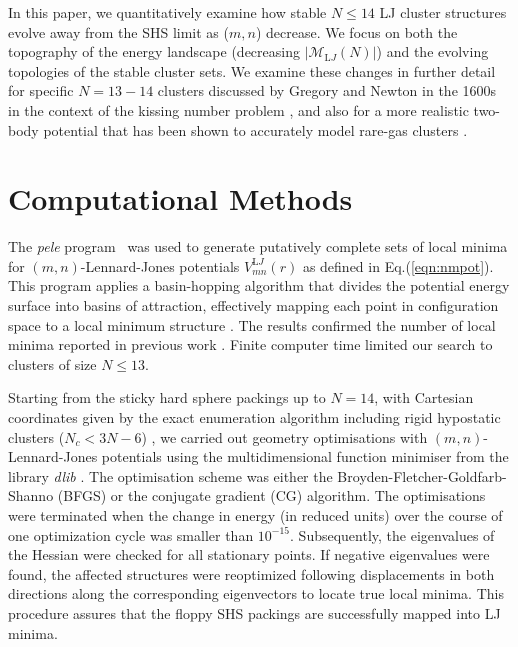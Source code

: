 In this paper, we quantitatively examine how stable $N \leq 14$ LJ cluster
structures evolve away from the SHS limit as ($m, n$) decrease.  We focus on
both the topography of the energy landscape (decreasing
$|\mathcal{M}_{\mathrm LJ}(N)|$) and the evolving topologies of the stable cluster sets.
We examine these changes in further detail for specific $N = 13-14$ clusters discussed by
Gregory and Newton in the 1600s in the context of the kissing number problem
\autocite{Schutte_ProblemdreizehnKugeln_1952}, and also for a more realistic two-body potential that has
been shown to accurately model rare-gas clusters \autocite{Schwerdtfeger_ExtensionLennardJonespotential_2006}.


\section{Computational Methods}

The \textit{pele} program~\autocite{_pelePythonenergy_2017} was used to generate putatively
complete sets of local minima for $(m,n)$-Lennard-Jones potentials 
$V_{mn}^{\mathrm LJ}(r)$ as defined in Eq.(\ref{eqn:nmpot}).
This program  applies a basin-hopping algorithm that divides the potential energy
surface into basins of attraction, effectively mapping each point in
configuration space to a local minimum structure
\autocite{lis87,waless99,Wales_GlobalOptimizationBasinHopping_1997}.  The results confirmed the
number of local minima reported in previous work \autocite{Doye_Saddlepointsdynamics_2002}.
Finite computer time limited our search to clusters of size $N \leq 13$.

Starting from the sticky hard sphere packings up to $N=14$, with Cartesian
coordinates given by the exact enumeration algorithm \autocite{Hoy_Structurefinitesphere_2012}
including rigid hypostatic clusters ($N_c<3N-6$) \autocite{Holmes-Cerfon_EnumeratingRigidSphere_2016}, we carried out geometry
optimisations with $(m,n)$-Lennard-Jones potentials using the multidimensional function minimiser from the
\Cpp library \textit{dlib} \autocite{King_DlibmlMachineLearning_2009}. The optimisation scheme
was either the Broyden-Fletcher-Goldfarb-Shanno (BFGS) or the conjugate
gradient (CG) algorithm.  The optimisations were terminated when the change in
energy (in reduced units) over the course of one optimization cycle was smaller
than $10^{-15}$. 
Subsequently, the eigenvalues of the Hessian were checked
for all stationary points. If negative eigenvalues were found, the affected
structures were reoptimized following displacements in both directions along
the corresponding eigenvectors to locate true local minima. This procedure assures
that the floppy SHS packings are successfully mapped into LJ minima.

